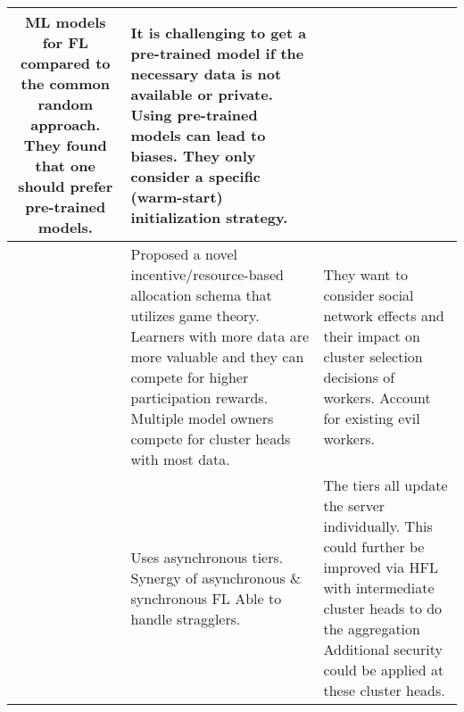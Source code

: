 \begin{changemargin}{-2cm}{0cm}
\begin{tabular}{|c||m{0.4\paperwidth}|m{0.4\paperwidth}|}
            ML models for FL compared to the common random approach.
            They found that one should prefer pre-trained models.
            &
            It is challenging to get a pre-trained model if the necessary data is not available or private.
            Using pre-trained models can lead to biases.
            They only consider a specific (warm-start) initialization strategy.
        \\
        \hline
            \cite{paper:decentralized_edge_intelligence_dynamic_resource_allocation_framework_hfl}
            &
            Proposed a novel incentive/resource-based allocation schema that utilizes game theory.
            Learners with more data are more valuable and they can compete for higher participation rewards.
            Multiple model owners compete for cluster heads with most data.
            &
            They want to consider social network effects and their impact on cluster selection decisions of workers.
            Account for existing evil workers.
        \\
        \hline
            \cite{paper:fedat_high_performance_communication_efficient_fl_with_asynch_tiers}
            &
            Uses asynchronous tiers.
            Synergy of asynchronous \& synchronous FL
            Able to handle stragglers.
            &
            The tiers all update the server individually.
            This could further be improved via HFL with intermediate cluster heads to do the aggregation
            Additional security could be applied at these cluster heads.
        \\
        \hline
    \end{tabular}
    \label{table:main_fl_research_table}
\end{changemargin}

